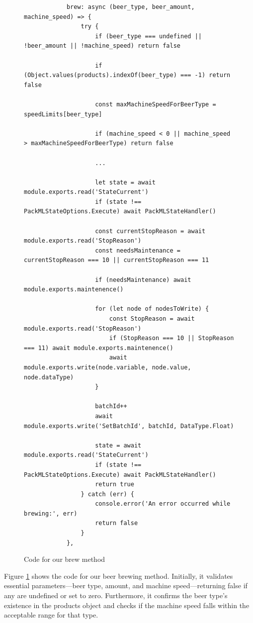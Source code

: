 \begin{center}
    \centering
    \begin{figure}[H]
        \begin{verbatim}
            brew: async (beer_type, beer_amount, machine_speed) => {
                try {
                    if (beer_type === undefined || !beer_amount || !machine_speed) return false                    

                    if (Object.values(products).indexOf(beer_type) === -1) return false

                    const maxMachineSpeedForBeerType = speedLimits[beer_type]

                    if (machine_speed < 0 || machine_speed > maxMachineSpeedForBeerType) return false

                    ... 

                    let state = await module.exports.read('StateCurrent')
                    if (state !== PackMLStateOptions.Execute) await PackMLStateHandler()

                    const currentStopReason = await module.exports.read('StopReason')
                    const needsMaintenance = currentStopReason === 10 || currentStopReason === 11

                    if (needsMaintenance) await module.exports.maintenence()

                    for (let node of nodesToWrite) {
                        const StopReason = await module.exports.read('StopReason')
                        if (StopReason === 10 || StopReason === 11) await module.exports.maintenence()
                        await module.exports.write(node.variable, node.value, node.dataType)
                    }

                    batchId++
                    await module.exports.write('SetBatchId', batchId, DataType.Float)

                    state = await module.exports.read('StateCurrent')
                    if (state !== PackMLStateOptions.Execute) await PackMLStateHandler()
                    return true
                } catch (err) {
                    console.error('An error occurred while brewing:', err)
                    return false
                }
            },
        \end{verbatim}
        \caption{Code for our brew method}
        \label{fig:opc_client_brew}
    \end{figure}
\end{center}
Figure \ref{fig:opc_client_brew} shows the code for our beer brewing method. Initially, it validates essential parameters—beer type, amount, and machine speed—returning false if any are undefined or set to zero. Furthermore, it confirms the beer type's existence in the products object and checks if the machine speed falls within the acceptable range for that type. \newline

